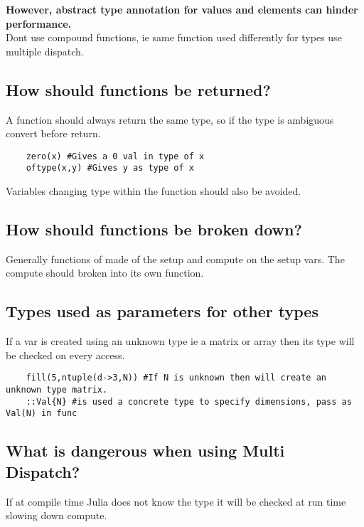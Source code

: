 \documentclass[11pt]{scrartcl} %
\begin{document}
\textbf{However, abstract type annotation for values and elements can hinder performance.}\\

Dont use compound functions, ie same function used differently for types use multiple dispatch.

\subsection{How should functions be returned?}

A function should always return the same type, so if the type is ambiguous convert before return.

\begin{verbatim}
	zero(x) #Gives a 0 val in type of x
	oftype(x,y) #Gives y as type of x
\end{verbatim}

Variables changing type within the function should also be avoided.

\subsection{How should functions be broken down?}

Generally functions of made of the setup and compute on the setup vars. The compute should
broken into its own function.

\subsection{Types used as parameters for other types}

If a var is created using an unknown type ie a matrix or array then its type will be checked on
every access.

\begin{verbatim}
	fill(5,ntuple(d->3,N)) #If N is unknown then will create an unknown type matrix.
	::Val{N} #is used a concrete type to specify dimensions, pass as Val(N) in func
\end{verbatim}

\subsection{What is dangerous when using Multi Dispatch?}

If at compile time Julia does not know the type it will be checked at run time slowing down
compute.
\end{document}
